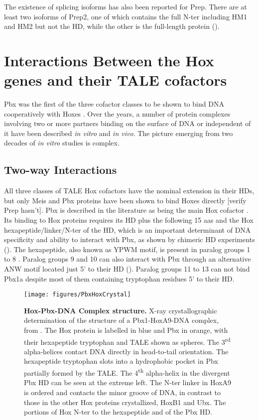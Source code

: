 The existence of splicing isoforms has also been reported for Prep. There are at least two isoforms of Prep2, one of which contains the full \ac{N-ter} including HM1 and HM2 but not the \ac{HD}, while the other is the full-length protein (\cite{Haller2004}).

\section{Interactions Between the Hox genes and their TALE cofactors}
\label{sec:interactions}

Pbx was the first of the three cofactor classes to be shown to bind DNA cooperatively with Hoxes \cite{Chan1994}. Over the years, a number of protein complexes involving two or more partners binding on the surface of DNA or independent of it have been described \textit{in vitro} and \textit{in vivo}. The picture emerging from two decades of \textit{in vitro} studies is complex. 

\subsection{Two-way Interactions}

All three classes of \ac{TALE} Hox cofactors have the nominal extension in their \acp{HD}, but only Meis and Pbx proteins have been shown to bind Hoxes directly [verify Prep hasn't]. Pbx is described in the literature as being the main Hox cofactor \cite{ref}. Its binding to Hox proteins requires its \ac{HD} plus the following 15 \acp{aa} and the Hox hexapeptide/linker/\ac{N-ter} of the \ac{HD}, which is an important determinant of DNA specificity and ability to interact with Pbx, as shown by chimeric \ac{HD} experiments (\cite{Chang1996, Phelan1997}). The hexapeptide, also known as YPWM motif, is present in paralog groups 1 to 8 \cite{Chang1995, Passner1999}. Paralog groups 9 and 10 can also interact with Pbx through an alternative ANW motif located just 5' to their \ac{HD} (\cite{Chang1996, Shen1997a}). Paralog groups 11 to 13 can not bind Pbx1a despite most of them containing tryptophan residues 5' to their \ac{HD}. 

\begin{figure}[]
  \centering
  \texttt{[image: figures/PbxHoxCrystal]}
  \caption[Hox-Pbx-DNA Complex structure]{\textbf{Hox-Pbx-DNA Complex structure.} X-ray crystallographic determination of the structure of a Pbx1-HoxA9-DNA complex, from \cite{LaRonde-LeBlanc2003}. The Hox protein is labelled in blue and Pbx in orange, with their hexapeptide tryptophan and \ac{TALE} shown as spheres. The 3\textsuperscript{rd} alpha-helices contact DNA directly in head-to-tail orientation. The hexapeptide tryptophan slots into a hydrophobic pocket in Pbx partially formed by the \ac{TALE}. The 4\textsuperscript{th} alpha-helix in the divergent Pbx \ac{HD} can be seen at the extreme left. The \ac{N-ter} linker in HoxA9 is ordered and contacts the minor groove of DNA, in contrast to those in the other Hox proteins crystallized, HoxB1 and Ubx. The portions of Hox \ac{N-ter} to the hexapeptide and of the Pbx \ac{HD}.}
  \label{fig:PbxHoxCrystal}
\end{figure}

